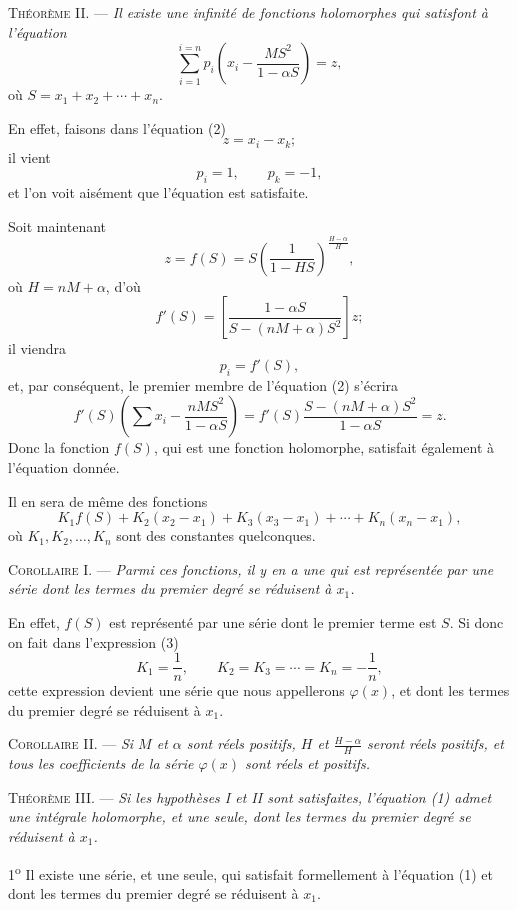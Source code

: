 \documentclass[11pt]{article}
\begin{document}
\noindent\textsc{Théorème II.} --- \emph{Il existe une infinité de fonctions holomorphes qui satisfont à l’équation}
\begin{equation*}\tag{2}
\sum_{i=1}^{i=n}p_i\left(x_i-\frac{MS^2}{1-\alpha S}\right)=z,
\end{equation*}
où $S=x_1+x_2+\cdots+x_n$.

En effet, faisons dans l’équation (2)
\[
z=x_i-x_k;
\]
il vient
\[
p_i=1,\qquad p_k=-1,
\]
et l’on voit aisément que l’équation est satisfaite.

Soit maintenant
\[
z=f(S)=S\left(\frac{1}{1-HS}\right)^{\frac{H-\alpha}{H}},
\]
où $H=nM+\alpha$, d’où
\[
f'(S)=\left[\frac{1-\alpha S}{S-(nM+\alpha)S^2}\right]z;
\]
il viendra
\[
p_i=f'(S),
\]
et, par conséquent, le premier membre de l’équation (2) s’écrira
\[
f'(S)\left(\sum x_i-\frac{nMS^2}{1-\alpha S}\right)
=f'(S)\frac{S-(nM+\alpha)S^2}{1-\alpha S}=z.
\]
Donc la fonction $f(S)$, qui est une fonction holomorphe, satisfait également à l’équation donnée.

Il en sera de même des fonctions
\begin{equation*}\tag{3}
K_1f(S)+K_2(x_2-x_1)+K_3(x_3-x_1)+\cdots+K_n(x_n-x_1),
\end{equation*}
où $K_1,K_2,\ldots,K_n$ sont des constantes quelconques.

\noindent\textsc{Corollaire I.} --- \emph{Parmi ces fonctions, il y en a une qui est représentée par une série dont les termes du premier degré se réduisent à $x_1$.}

En effet, $f(S)$ est représenté par une série dont le premier terme est $S$.
Si donc on fait dans l’expression (3)
\[
K_1=\frac1n,\qquad K_2=K_3=\cdots=K_n=-\frac1n,
\]
cette expression devient une série que nous appellerons $\varphi(x)$, et dont les termes du premier degré se réduisent à $x_1$.

\noindent\textsc{Corollaire II.} --- \emph{Si $M$ et $\alpha$ sont réels positifs, $H$ et $\frac{H-\alpha}{H}$ seront réels positifs, et tous les coefficients de la série $\varphi(x)$ sont réels et positifs.}

\noindent\textsc{Théorème III.} --- \emph{Si les hypothèses I et II sont satisfaites, l’équation (1) admet une intégrale holomorphe, et une seule, dont les termes du premier degré se réduisent à $x_1$.}

1\textsuperscript{o} Il existe une série, et une seule, qui satisfait formellement à l’équation (1) et dont les termes du premier degré se réduisent à $x_1$.
\end{document}
